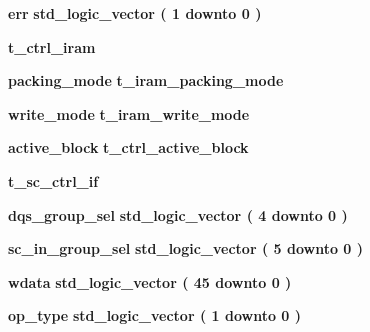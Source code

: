 \begin{DoxyCompactItemize}
\item 
{\bf err} {\bfseries {\bfseries \textcolor{comment}{std\+\_\+logic\+\_\+vector}\textcolor{vhdlchar}{ }\textcolor{vhdlchar}{(}\textcolor{vhdlchar}{ }\textcolor{vhdlchar}{ } \textcolor{vhdldigit}{1} \textcolor{vhdlchar}{ }\textcolor{keywordflow}{downto}\textcolor{vhdlchar}{ }\textcolor{vhdlchar}{ } \textcolor{vhdldigit}{0} \textcolor{vhdlchar}{ }\textcolor{vhdlchar}{)}\textcolor{vhdlchar}{ }}} 
\item 
{\bf t\+\_\+ctrl\+\_\+iram} {\bfseries  }
\item 
{\bf packing\+\_\+mode} {\bfseries {\bfseries {\bfseries {\bf t\+\_\+iram\+\_\+packing\+\_\+mode}} \textcolor{vhdlchar}{ }}} 
\item 
{\bf write\+\_\+mode} {\bfseries {\bfseries {\bfseries {\bf t\+\_\+iram\+\_\+write\+\_\+mode}} \textcolor{vhdlchar}{ }}} 
\item 
{\bf active\+\_\+block} {\bfseries {\bfseries {\bfseries {\bf t\+\_\+ctrl\+\_\+active\+\_\+block}} \textcolor{vhdlchar}{ }}} 
\item 
{\bf t\+\_\+sc\+\_\+ctrl\+\_\+if} {\bfseries  }
\item 
{\bf dqs\+\_\+group\+\_\+sel} {\bfseries {\bfseries \textcolor{comment}{std\+\_\+logic\+\_\+vector}\textcolor{vhdlchar}{ }\textcolor{vhdlchar}{(}\textcolor{vhdlchar}{ }\textcolor{vhdlchar}{ } \textcolor{vhdldigit}{4} \textcolor{vhdlchar}{ }\textcolor{keywordflow}{downto}\textcolor{vhdlchar}{ }\textcolor{vhdlchar}{ } \textcolor{vhdldigit}{0} \textcolor{vhdlchar}{ }\textcolor{vhdlchar}{)}\textcolor{vhdlchar}{ }}} 
\item 
{\bf sc\+\_\+in\+\_\+group\+\_\+sel} {\bfseries {\bfseries \textcolor{comment}{std\+\_\+logic\+\_\+vector}\textcolor{vhdlchar}{ }\textcolor{vhdlchar}{(}\textcolor{vhdlchar}{ }\textcolor{vhdlchar}{ } \textcolor{vhdldigit}{5} \textcolor{vhdlchar}{ }\textcolor{keywordflow}{downto}\textcolor{vhdlchar}{ }\textcolor{vhdlchar}{ } \textcolor{vhdldigit}{0} \textcolor{vhdlchar}{ }\textcolor{vhdlchar}{)}\textcolor{vhdlchar}{ }}} 
\item 
{\bf wdata} {\bfseries {\bfseries \textcolor{comment}{std\+\_\+logic\+\_\+vector}\textcolor{vhdlchar}{ }\textcolor{vhdlchar}{(}\textcolor{vhdlchar}{ }\textcolor{vhdlchar}{ } \textcolor{vhdldigit}{45} \textcolor{vhdlchar}{ }\textcolor{keywordflow}{downto}\textcolor{vhdlchar}{ }\textcolor{vhdlchar}{ } \textcolor{vhdldigit}{0} \textcolor{vhdlchar}{ }\textcolor{vhdlchar}{)}\textcolor{vhdlchar}{ }}} 
\item 
{\bf op\+\_\+type} {\bfseries {\bfseries \textcolor{comment}{std\+\_\+logic\+\_\+vector}\textcolor{vhdlchar}{ }\textcolor{vhdlchar}{(}\textcolor{vhdlchar}{ }\textcolor{vhdlchar}{ } \textcolor{vhdldigit}{1} \textcolor{vhdlchar}{ }\textcolor{keywordflow}{downto}\textcolor{vhdlchar}{ }\textcolor{vhdlchar}{ } \textcolor{vhdldigit}{0} \textcolor{vhdlchar}{ }\textcolor{vhdlchar}{)}\textcolor{vhdlchar}{ }}} 

\end{DoxyCompactItemize}
